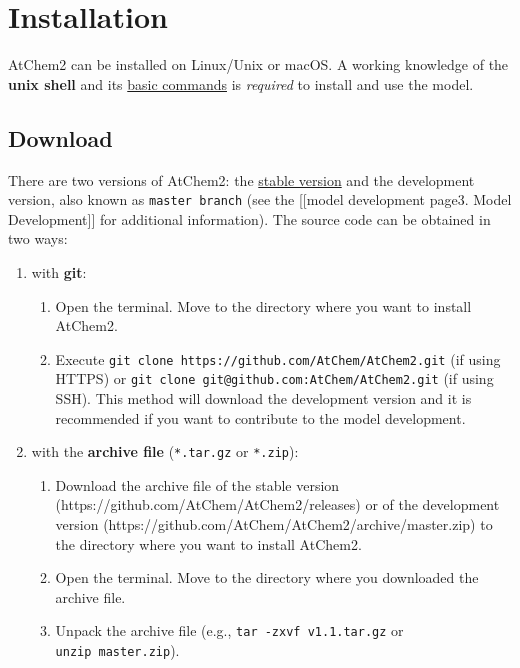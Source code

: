\section{Installation} \label{sec:install}

AtChem2 can be installed on Linux/Unix or macOS. A working knowledge of
the \textbf{unix shell} and its
\href{https://swcarpentry.github.io/shell-novice/reference/}{basic
commands} is \emph{required} to install and use the model.

\subsection{Download}\label{download}

There are two versions of AtChem2: the
\href{https://github.com/AtChem/AtChem2/releases}{stable version} and
the development version, also known as \texttt{master\ branch} (see the
{[}{[}model development page\textbar{}3. Model Development{]}{]} for
additional information). The source code can be obtained in two ways:

\begin{enumerate}
\def\labelenumi{\arabic{enumi}.}
\item
  with \textbf{git}:

  \begin{enumerate}
  \def\labelenumii{\arabic{enumii}.}
    \item
    Open the terminal. Move to the directory where you want to install
    AtChem2.
  \item
    Execute \texttt{git\ clone\ https://github.com/AtChem/AtChem2.git}
    (if using HTTPS) or
    \texttt{git\ clone\ git@github.com:AtChem/AtChem2.git} (if using
    SSH). This method will download the development version and it is
    recommended if you want to contribute to the model development.
  \end{enumerate}
\item
  with the \textbf{archive file} (\texttt{*.tar.gz} or \texttt{*.zip}):

  \begin{enumerate}
  \def\labelenumii{\arabic{enumii}.}
    \item
    Download the archive file of the stable version
    (https://github.com/AtChem/AtChem2/releases) or of the development
    version (https://github.com/AtChem/AtChem2/archive/master.zip) to
    the directory where you want to install AtChem2.
  \item
    Open the terminal. Move to the directory where you downloaded the
    archive file.
  \item
    Unpack the archive file (e.g., \texttt{tar\ -zxvf\ v1.1.tar.gz} or
    \texttt{unzip\ master.zip}).
  \end{enumerate}
\end{enumerate}

